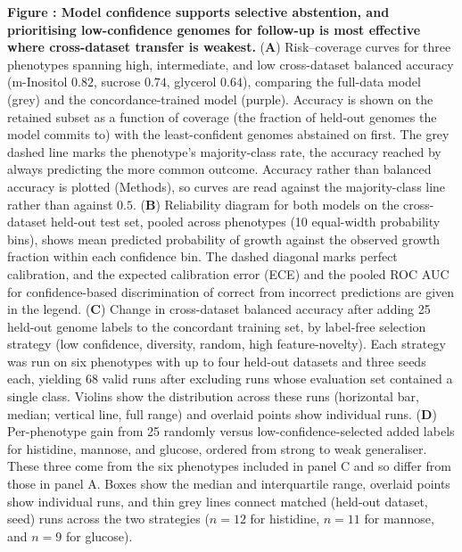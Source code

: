 \label{fig:selective_prediction}%
\noindent\textbf{Figure : Model confidence supports selective abstention, and prioritising low-confidence genomes for follow-up is most effective where cross-dataset transfer is weakest.}
(\textbf{A}) Risk--coverage curves for three phenotypes spanning high, intermediate, and low cross-dataset balanced accuracy (m-Inositol $0.82$, sucrose $0.74$, glycerol $0.64$), comparing the full-data model (grey) and the concordance-trained model (purple).
Accuracy is shown on the retained subset as a function of coverage (the fraction of held-out genomes the model commits to) with the least-confident genomes abstained on first.
The grey dashed line marks the phenotype's majority-class rate, the accuracy reached by always predicting the more common outcome.
Accuracy rather than balanced accuracy is plotted (Methods), so curves are read against the majority-class line rather than against $0.5$.
(\textbf{B}) Reliability diagram for both models on the cross-dataset held-out test set, pooled across phenotypes (10 equal-width probability bins), shows mean predicted probability of growth against the observed growth fraction within each confidence bin.
The dashed diagonal marks perfect calibration, and the expected calibration error (ECE) and the pooled ROC AUC for confidence-based discrimination of correct from incorrect predictions are given in the legend.
(\textbf{C}) Change in cross-dataset balanced accuracy after adding 25 held-out genome labels to the concordant training set, by label-free selection strategy (low confidence, diversity, random, high feature-novelty).
Each strategy was run on six phenotypes with up to four held-out datasets and three seeds each, yielding 68 valid runs after excluding runs whose evaluation set contained a single class.
Violins show the distribution across these runs (horizontal bar, median; vertical line, full range) and overlaid points show individual runs.
(\textbf{D}) Per-phenotype gain from 25 randomly versus low-confidence-selected added labels for histidine, mannose, and glucose, ordered from strong to weak generaliser.
These three come from the six phenotypes included in panel C and so differ from those in panel A.
Boxes show the median and interquartile range, overlaid points show individual runs, and thin grey lines connect matched (held-out dataset, seed) runs across the two strategies ($n=12$ for histidine, $n=11$ for mannose, and $n=9$ for glucose).

